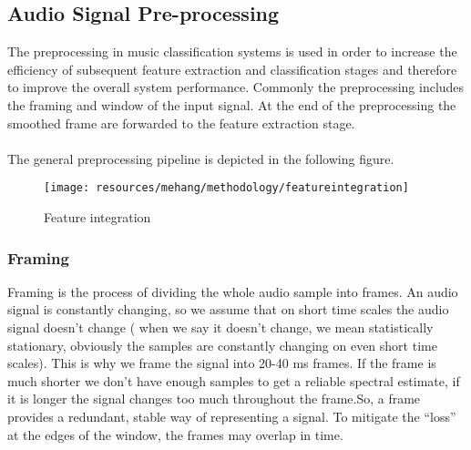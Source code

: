 \subsection{Audio Signal Pre-processing}
The preprocessing in music classification systems is used in order to increase the efficiency of subsequent feature extraction and classification stages and therefore to improve the overall system performance. Commonly the preprocessing includes the framing and window of the input signal. At the end of the preprocessing the smoothed frame are forwarded to the feature extraction stage.\\ 
\\
The general preprocessing pipeline is depicted in the following figure.
\begin{figure}[h!]
        \centering
        \texttt{[image: resources/mehang/methodology/featureintegration]}
        \caption{Feature integration}
\end{figure}

\subsubsection{Framing}
Framing is the process of dividing the whole audio sample into frames. An audio signal is constantly changing, so we assume that on short time scales the audio signal doesn’t change ( when we say it doesn’t change, we mean statistically stationary, obviously the samples are constantly changing on even short time scales). This is why we frame the signal into 20-40 ms frames. If the frame is much shorter we don’t have enough samples to get a reliable spectral estimate, if it is longer the signal changes too much throughout the frame.So, a frame provides a redundant, stable way of representing a signal.
To mitigate the “loss” at the edges of the window, the frames may overlap in time.

